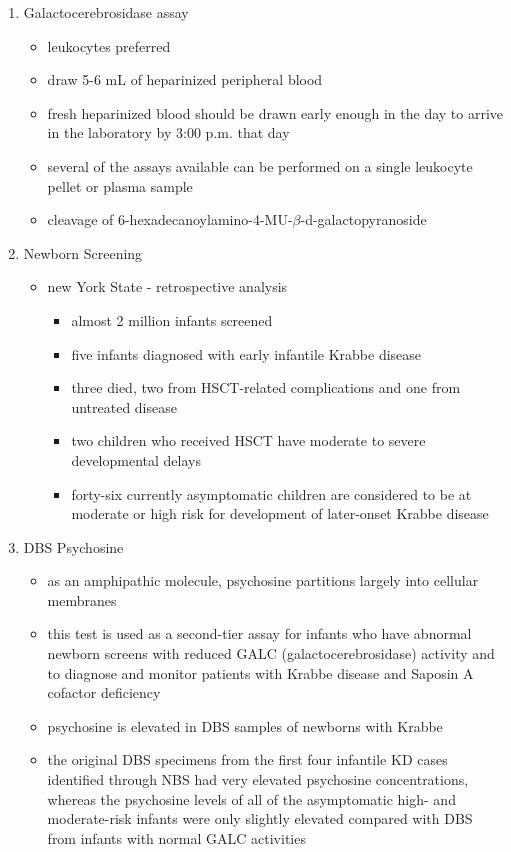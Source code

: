 \documentclass{scrartcl}
\begin{document}
\begin{enumerate}
\begin{enumerate}
\item Galactocerebrosidase assay
\label{sec:orga58cdb6}
\begin{itemize}
\item leukocytes preferred
\item draw 5-6 mL of heparinized peripheral blood
\item fresh heparinized blood should be drawn early enough in the day to arrive in the laboratory by 3:00 p.m. that day
\item several of the assays available can be performed on a single leukocyte pellet or plasma sample
\item cleavage of 6-hexadecanoylamino-4-MU-\(\beta\)-d-galactopyranoside
\end{itemize}
\item Newborn Screening
\label{sec:org9525f7c}
\begin{itemize}
\item new York State - retrospective analysis
\begin{itemize}
\item almost 2 million infants screened
\item five infants diagnosed with early infantile Krabbe disease
\item three died, two from HSCT-related complications and one from untreated disease
\item two children who received HSCT have moderate to severe developmental delays
\item forty-six currently asymptomatic children are considered to be at
moderate or high risk for development of later-onset Krabbe disease
\end{itemize}
\end{itemize}

\item DBS Psychosine
\label{sec:org11466bf}
\begin{itemize}
\item as an amphipathic molecule, psychosine partitions largely into
cellular membranes
\item this test is used as a second-tier assay for infants who have
abnormal newborn screens with reduced GALC (galactocerebrosidase)
activity and to diagnose and monitor patients with Krabbe disease
and Saposin A cofactor deficiency

\item psychosine is elevated in DBS samples of newborns with Krabbe

\item the original DBS specimens from the first four infantile
KD cases identified through NBS had very elevated psychosine
concentrations, whereas the psychosine levels of all of the
asymptomatic high- and moderate-risk infants were only slightly
elevated compared with DBS from infants with normal GALC activities
\end{itemize}


\end{enumerate}
\end{enumerate}
\end{document}
